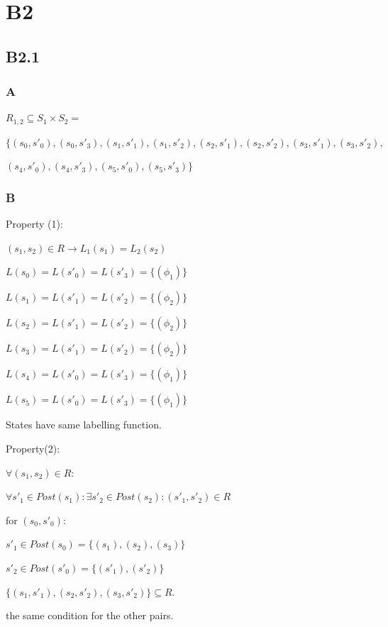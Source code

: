 
\section{B2}

\subsection{B2.1}

\subsubsection{A}

$R_{1,2} \subseteq S_1 \times S_2 =$

$\{(s_0,s'_0),(s_0,s'_3), (s_1,{s'}_1),(s_1,s'_2),(s_2,s'_1),(s_2,s'_2),(s_3,s'_1),(s_3,s'_2),$

$(s_4,s'_0),(s_4,s'_3),(s_5,s'_0),(s_5,s'_3)\}$

\subsubsection{B}

Property (1):

$(s_1,s_2) \in R \rightarrow L_1(s_1) = L_2(s_2)$

$L(s_0)=L(s'_0)=L(s'_3)=\{(\phi_1)\}$

$L(s_1)=L(s'_1)=L(s'_2)=\{(\phi_2)\}$

$L(s_2)=L(s'_1)=L(s'_2)=\{(\phi_2)\}$

$L(s_3)=L(s'_1)=L(s'_2)=\{(\phi_2)\}$

$L(s_4)=L(s'_0)=L(s'_3)=\{(\phi_1)\}$

$L(s_5)=L(s'_0)=L(s'_3)=\{(\phi_1)\}$

States have same labelling function.

\indent

\noindent
Property(2):

$\forall (s_1, s_2) \in R:$

$\forall s'_1 \in Post(s_1): \exists s'_2 \in Post(s_2): (s'_1, s'_2) \in R$

for $(s_0, s'_0):$

$s'_1 \in Post(s_0)=\{(s_1),(s_2),(s_3)\}$

$s'_2 \in Post(s'_0)=\{(s'_1),(s'_2)\}$

$\{(s_1,s'_1), (s_2,s'_2),(s_3,s'_2)\} \subseteq R.$

the same condition for the other pairs.

\indent

